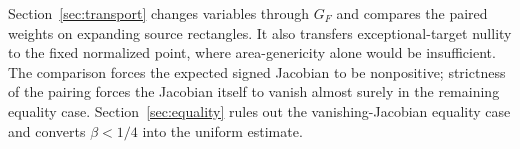Section~\ref{sec:transport} changes variables through \(G_F\) and
compares the paired weights on expanding source rectangles. It also
transfers exceptional-target nullity to the fixed normalized point,
where area-genericity alone would be insufficient.
The comparison forces the expected signed Jacobian to be nonpositive;
strictness of the pairing forces the Jacobian itself to vanish almost
surely in the remaining equality case.
Section~\ref{sec:equality} rules out the vanishing-Jacobian equality
case and converts \(\beta<1/4\) into the uniform estimate.
